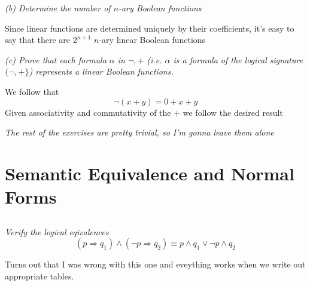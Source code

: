 \documentclass[11pt,oneside,titlepage]{book}
\DeclareMathOperator \ra {\Rightarrow}
\newcommand{\set}[1]{\{ #1 \}}
\begin{document}
\textit{(b) Determine the number of $n$-ary Boolean functions}

Since linear functions are determined uniquely by their coefficients, it's easy to say
that there are $2^{n + 1}$ $n$-ary linear Boolean functions

\textit{(c) Prove that each formula $\alpha$ in $\neg, +$ (i.e. $\alpha$ is a formula of the
  logical signature $\set{\neg, +}$) represents a linear Boolean functions.}

We follow that
$$\neg(x + y) = 0 + x + y$$
Given associativity and commutativity of the $+$ we follow the desired result

\textit{The rest of the exercises are pretty trivial, so I'm gonna leave them alone}

\section{Semantic Equivalence and Normal Forms}

\subsection{}

\textit{Verify the logical eqivalences}
$$(p \ra q_1) \land (\neg p \ra q_2) \equiv p \land q_1 \lor \neg p \land q_2$$

Turns out that I was wrong with this one and eveything works when we write out appropriate tables.
\end{document}

